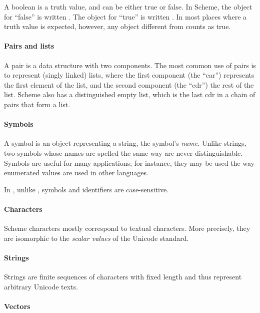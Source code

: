 A boolean is a truth value, and can be either
true or false.  In Scheme, the object for ``false'' is written
\schfalse{}.  The object for ``true'' is written \schtrue{}.  In
most places where a truth value is expected, however, any object different from
\schfalse{} counts as true.

\paragraph{Pairs and lists}

A pair is a data structure with two components.  The most common use
of pairs is to represent (singly linked) lists, where the first
component (the ``car'') represents the first element of the list, and
the second component (the ``cdr'') the rest of the list.  Scheme also
has a distinguished empty list, which is the last cdr in a chain of
pairs that form a list.

\paragraph{Symbols}

A symbol is an object representing a string,
the symbol's \textit{name}.
Unlike strings, two symbols whose names are spelled the same
way are never distinguishable.  Symbols are useful for many applications;
for instance, they may be used the way enumerated values are used in
other languages.

In \rsevenrs, unlike \rfivers, symbols and identifiers are case-sensitive.

\paragraph{Characters}

Scheme characters mostly correspond to textual characters.
More precisely, they are isomorphic to the \textit{scalar values} of
the Unicode standard.

\paragraph{Strings}

Strings are finite sequences of characters with fixed length and thus
represent arbitrary Unicode texts.

\paragraph{Vectors}

